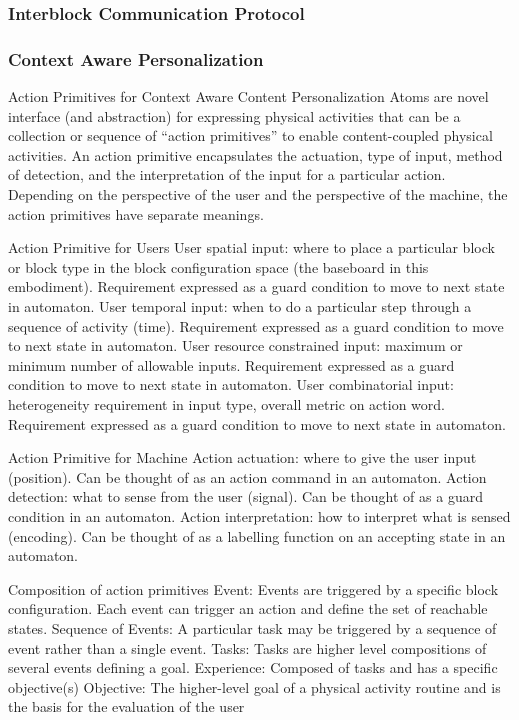 \documentclass[]{article}
\begin{document}
\subsubsection{Interblock Communication Protocol}

\subsubsection{Context Aware Personalization}
Action Primitives for Context Aware Content Personalization
Atoms are novel interface (and abstraction) for expressing physical activities that can be a collection or sequence of “action primitives” to enable content-coupled physical activities. An action primitive encapsulates the actuation, type of input, method of detection, and the interpretation of the input for a particular action. Depending on the perspective of the user and the perspective of the machine, the action primitives have separate meanings.

Action Primitive for Users
User spatial input: where to place a particular block or block type in the block configuration space (the baseboard in this embodiment). Requirement expressed as a guard condition to move to next state in automaton.
User temporal input: when to do a particular step through a sequence of activity (time). Requirement expressed as a guard condition to move to next state in automaton.
User resource constrained input: maximum or minimum  number of allowable inputs. Requirement expressed as a guard condition to move to next state in automaton.
User combinatorial input: heterogeneity requirement in input type, overall metric on action word. Requirement expressed as a guard condition to move to next state in automaton.

Action Primitive for Machine
Action actuation: where to give the user input (position). Can be thought of as an action command in an automaton.
Action detection: what to sense from the user (signal). Can be thought of as a guard condition in an automaton.
Action interpretation: how to interpret what is sensed (encoding). Can be thought of as a labelling function on an accepting state in an automaton.

Composition of action primitives
Event:  Events are triggered by a specific block configuration. Each event can trigger an action and define the set of reachable states. 
Sequence of Events: A particular task may be triggered by a sequence of event rather than a single event. 
Tasks: Tasks are higher level compositions of several events defining a goal.
Experience: Composed of tasks and has a specific objective(s)
Objective: The higher-level goal of a physical activity routine and is the basis for the evaluation of the user
\end{document}
